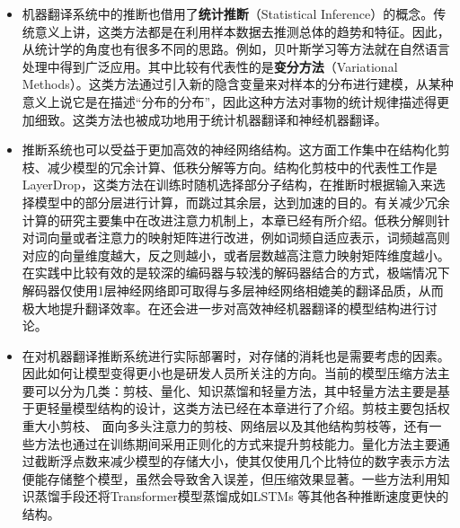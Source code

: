 \begin{itemize}
\vspace{0.5em}
\item 机器翻译系统中的推断也借用了{\small\sffamily\bfseries{统计推断}}（Statistical Inference）的概念。传统意义上讲，这类方法都是在利用样本数据去推测总体的趋势和特征。因此，从统计学的角度也有很多不同的思路。例如，贝叶斯学习等方法就在自然语言处理中得到广泛应用。其中比较有代表性的是{\small\sffamily\bfseries{变分方法}}（Variational Methods）。这类方法通过引入新的隐含变量来对样本的分布进行建模，从某种意义上说它是在描述“分布的分布”，因此这种方法对事物的统计规律描述得更加细致。这类方法也被成功地用于统计机器翻译和神经机器翻译。
\vspace{0.5em}
\item 推断系统也可以受益于更加高效的神经网络结构。这方面工作集中在结构化剪枝、减少模型的冗余计算、低秩分解等方向。结构化剪枝中的代表性工作是LayerDrop，这类方法在训练时随机选择部分子结构，在推断时根据输入来选择模型中的部分层进行计算，而跳过其余层，达到加速的目的。有关减少冗余计算的研究主要集中在改进注意力机制上，本章已经有所介绍。低秩分解则针对词向量或者注意力的映射矩阵进行改进，例如词频自适应表示，词频越高则对应的向量维度越大，反之则越小，或者层数越高注意力映射矩阵维度越小。在实践中比较有效的是较深的编码器与较浅的解码器结合的方式，极端情况下解码器仅使用1层神经网络即可取得与多层神经网络相媲美的翻译品质，从而极大地提升翻译效率。在{\chapterfifteen}还会进一步对高效神经机器翻译的模型结构进行讨论。
\vspace{0.5em}
\item 在对机器翻译推断系统进行实际部署时，对存储的消耗也是需要考虑的因素。因此如何让模型变得更小也是研发人员所关注的方向。当前的模型压缩方法主要可以分为几类：剪枝、量化、知识蒸馏和轻量方法，其中轻量方法主要是基于更轻量模型结构的设计，这类方法已经在本章进行了介绍。剪枝主要包括权重大小剪枝、 面向多头注意力的剪枝、网络层以及其他结构剪枝等，还有一些方法也通过在训练期间采用正则化的方式来提升剪枝能力。量化方法主要通过截断浮点数来减少模型的存储大小，使其仅使用几个比特位的数字表示方法便能存储整个模型，虽然会导致舍入误差，但压缩效果显著。一些方法利用知识蒸馏手段还将Transformer模型蒸馏成如LSTMs 等其他各种推断速度更快的结构。

\end{itemize}
